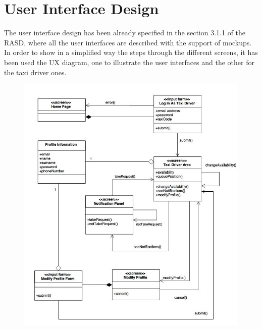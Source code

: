 \documentclass[18pt,oneside,a4paper, titlepage]{article}
\begin{document}
	\section{User Interface Design}
		The user interface design has been already specified in the section 3.1.1 of the RASD, where all the user interfaces are described with the support of mockups.
		In order to show in a simplified way the steps through the different screens, it has been used the UX diagram, one to illustrate the user interfaces and the other for the taxi driver ones.
		\vspace{1cm}
		\begin{figure}[h]
			\centering
			\includegraphics[scale=0.7]{Diagrams/UXDiagramTaxiDriver.jpg}
		\end{figure}
		
\end{document}
